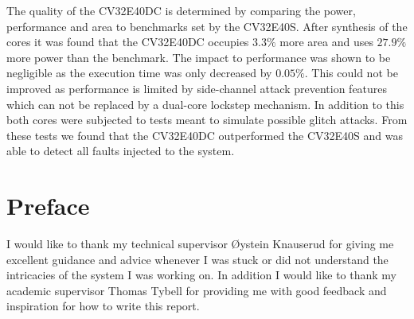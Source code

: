 The quality of the CV32E40DC is determined by comparing the power, performance and area to benchmarks set by the CV32E40S. After synthesis of the cores it was found that the CV32E40DC occupies $3.3\%$ more area and uses $27.9\%$ more power than the benchmark. The impact to performance was shown to be negligible as the execution time was only decreased by $0.05\%$. This could not be improved as performance is limited by side-channel attack prevention features which can not be replaced by a dual-core lockstep mechanism. In addition to this both cores were subjected to tests meant to simulate possible glitch attacks. From these tests we found that the CV32E40DC outperformed the CV32E40S and was able to detect all faults injected to the system. 


\chapter{Preface}

I would like to thank my technical supervisor Øystein Knauserud for giving me excellent guidance and advice whenever I was stuck or did not understand the intricacies of the system I was working on. In addition I would like to thank my academic supervisor Thomas Tybell for providing me with good feedback and inspiration for how to write this report. 

